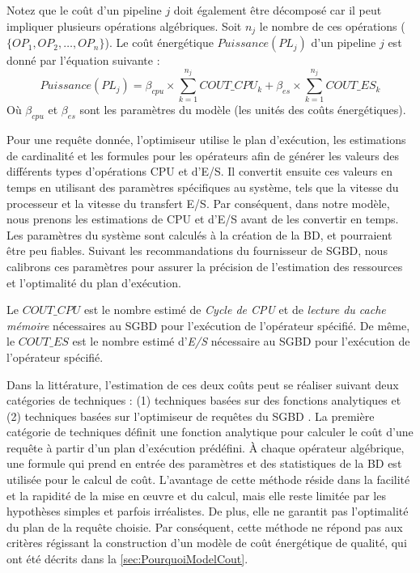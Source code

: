 Notez que le coût d'un pipeline $j$ doit également être décomposé car il peut impliquer plusieurs opérations algébriques. Soit $n_j$ le nombre de ces opérations ($\{OP_1, OP_2, \dots, OP_n\}$). Le coût énergétique $Puissance(PL_j)$ d'un pipeline $j$ est donné par l'équation suivante :
\begin{equation} \label{eq:cost-model}
Puissance({PL_j}) = \beta_{cpu} \times \sum_{k=1}^{n_j} COUT\_CPU_k + \beta_{es} \times  \sum_{k=1}^{n_j} COUT\_ES_k
\end{equation}
Où $\beta_{cpu}$ et $\beta_{es}$ sont les paramètres du modèle (les unités des coûts énergétiques).

Pour une requête donnée, l'optimiseur utilise le plan d'exécution, les estimations de cardinalité et les formules pour les opérateurs afin de générer les valeurs des différents types d'opérations CPU et d'E/S. Il convertit ensuite ces valeurs en temps en utilisant des paramètres spécifiques au système, tels que la vitesse du processeur et la vitesse du transfert E/S. Par conséquent, dans notre modèle, nous prenons les estimations de CPU et d'E/S avant de les convertir en temps.
Les paramètres du système sont calculés à la création de la BD, et pourraient être peu fiables. Suivant les recommandations du fournisseur de SGBD, nous calibrons ces paramètres pour assurer la précision de l'estimation des ressources et  l'optimalité du plan d'exécution.

Le $COUT\_CPU$ est le nombre estimé de \textit{Cycle de CPU} et de \textit{lecture du cache mémoire} nécessaires au SGBD pour l'exécution de l'opérateur spécifié. De même, le $COUT\_ES$ est le nombre estimé d'\textit {E/S} nécessaire au SGBD pour l'exécution de l'opérateur spécifié.

Dans la littérature, l'estimation de ces deux coûts peut se réaliser suivant deux catégories de techniques : (1) techniques basées sur des fonctions analytiques et (2) techniques basées sur l'optimiseur de requêtes du SGBD \cite{Boukhalfa09Phd}. La première catégorie de techniques \cite{Boukorca15, Kerkad12a, Bouchakri11a} définit une fonction analytique pour calculer le coût d'une requête à partir d'un plan d'exécution prédéfini. À chaque opérateur algébrique, une formule qui prend en entrée des paramètres et des statistiques de la BD est utilisée pour le calcul de coût. L'avantage de cette méthode réside dans la facilité et la rapidité de la mise en œuvre et du calcul, mais elle reste limitée par les hypothèses simples et parfois irréalistes. De plus, elle ne garantit pas l'optimalité  du plan de la requête choisie. Par conséquent, cette méthode ne répond pas aux critères régissant la construction d'un modèle de coût énergétique de qualité, qui ont été décrits dans la \ref{sec:PourquoiModelCout}.

